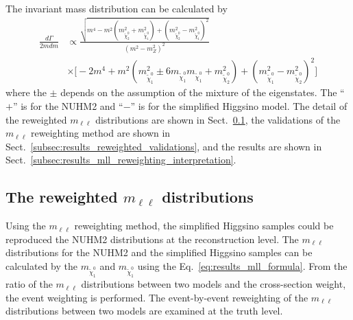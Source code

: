 The invariant mass distribution can be calculated by
%
\begin{align}
    \frac{d\Gamma}{2mdm}
    & \propto \frac{\sqrt{m^{4}-m^{2}(m^{2}_{\widetilde{\chi}^{0}_{2}} + m^{2}_{\widetilde{\chi}^{0}_{1}})+(m^{2}_{\widetilde{\chi}^{0}_{2}} - m^{2}_{\widetilde{\chi}^{0}_{1}})^{2}}}{(m^{2} - m^{2}_{Z})^{2}}\\
    & \times \Big[-2m^{4}+m^{2}(m^{2}_{\widetilde{\chi}^{0}_{1}} \pm 6 m_{\widetilde{\chi}^{0}_{1}} m_{\widetilde{\chi}^{0}_{1}} + m^{2}_{\widetilde{\chi}^{0}_{2}})+(m^{2}_{\widetilde{\chi}^{0}_{1}} - m^{2}_{\widetilde{\chi}^{0}_{2}})^{2}\Big]
    \label{eq:results_mll_formula}
\end{align}
%
where the $\pm$ depends on the assumption of the mixture of the eigenstates.
The ``$+$'' is for the NUHM2 and ``$-$'' is for the simplified Higgsino model.
The detail of the reweighted $m_{\ell \ell}$ distributions are shown in Sect.~\ref{subsec:results_reweighted_mll_distributions}, the validations of the $m_{\ell \ell}$ reweighting method are shown in Sect.~\ref{subsec:results_reweighted_validations}, and the results are shown in Sect.~\ref{subsec:results_mll_reweighting_interpretation}.


\subsection{The reweighted $m_{\ell \ell}$ distributions}
\label{subsec:results_reweighted_mll_distributions}
Using the $m_{\ell \ell}$ reweighting method, the simplified Higgsino samples could be reproduced the NUHM2 distributions at the reconstruction level.
The $m_{\ell \ell}$ distributions for the NUHM2 and the simplified Higgsino samples can be calculated by the $m_{\widetilde{\chi}^{0}_{1}}$ and $m_{\widetilde{\chi}^{0}_{1}}$ using the Eq.~\ref{eq:results_mll_formula}.
From the ratio of the $m_{\ell \ell}$ distributions between two models and the cross-section weight, the event weighting is performed.
The event-by-event reweighting of the $m_{\ell \ell}$ distributions between two models are examined at the truth level.

